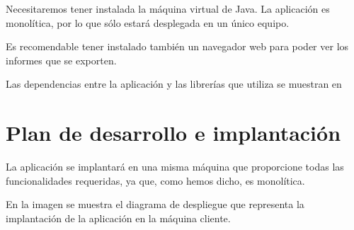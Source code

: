 Necesitaremos tener instalada la máquina virtual de Java. La aplicación es monolítica, por lo que sólo estará desplegada en un único equipo.

Es recomendable tener instalado también un navegador web para poder ver los informes que se exporten.

Las dependencias entre la aplicación y las librerías que utiliza se muestran en 


\newpage

\section{Plan de desarrollo e implantación}
La aplicación se implantará en una misma máquina que proporcione todas las funcionalidades requeridas, ya que, como hemos dicho, es monolítica.

En la imagen  se muestra el diagrama de despliegue que representa la implantación de la aplicación en la máquina cliente.

